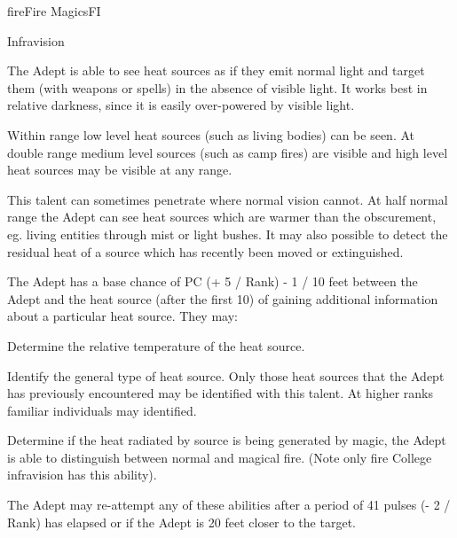 \begin{college}[2.0]{fire}{Fire Magics}{FI}
\begin{talent}[T-1]{Infravision}
\begin{effects}
The Adept is able to see heat sources as if they emit normal light and
target them (\eg with weapons or spells) in the absence of visible
light.  It works best in relative darkness, since it is easily
over-powered by visible light.

Within range low level heat sources (such as living bodies) can be
seen. At double range medium level sources (such as camp fires) are
visible and high level heat sources may be visible at any range.

This talent can sometimes penetrate where normal vision cannot. At
half normal range the Adept can see heat sources which are warmer than
the obscurement, eg. living entities through mist or light bushes. It
may also possible to detect the residual heat of a source which has
recently been moved or extinguished.

The Adept has a base chance of PC (+ 5 / Rank) - 1 / 10 feet between
the Adept and the heat source (after the first 10) of gaining
additional information about a particular heat source. They may:

\begin{Enumerate}
\item
Determine the relative temperature of the heat source.

\item
Identify the general type of heat source. Only those heat sources that
the Adept has previously encountered may be identified with this
talent. At higher ranks familiar individuals may identified.

\item
Determine if the heat radiated by source is being generated by magic,
\eg the Adept is able to distinguish between normal and magical
fire. (Note only fire College infravision has this ability).

The Adept may re-attempt any of these abilities after a period of 41
pulses (- 2 / Rank) has elapsed or if the Adept is 20 feet closer to
the target.
\end{Enumerate}
\end{effects}
\end{talent}


\end{college}

